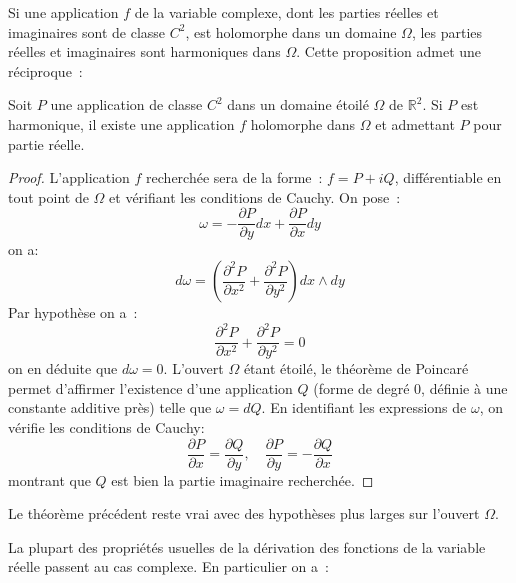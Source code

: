Si une application $f$ de la variable complexe, dont les parties
réelles et imaginaires sont de classe $C^2$, est holomorphe dans un
domaine $\Omega$, les parties réelles et imaginaires sont harmoniques
dans $\Omega$. Cette proposition admet une réciproque~:
\begin{theorem}
Soit $P$ une application de classe $C^2$ dans un domaine étoilé
$\Omega$ de
$\mathbb{R}^2$. 
Si $P$ est harmonique, il existe une application $f$ holomorphe dans $\Omega$ et
admettant $P$ pour partie réelle.
\end{theorem}
\begin{proof}
L'application $f$ recherchée sera de la forme~:
$f = P + i Q$, différentiable en tout point de $\Omega$ et vérifiant
les conditions de Cauchy. On pose~:
\[
\omega = - \frac{\partial P}{\partial y} dx + \frac{\partial P}{\partial
  x} dy
\]
on a:
\[
d \omega = \left(\frac{\partial^2 P}{\partial x^2} + \frac{\partial^2
P}{\partial y^2} \right)dx \wedge dy 
\]
Par hypothèse on a~:
\[
\frac{\partial^2 P}{\partial x^2} + \frac{\partial^2 P}{\partial y^2} = 0  
\]
on en déduite que $d\omega=0$. L'ouvert $\Omega$ étant étoilé, le théorème de Poincaré
permet d'affirmer l'existence d'une application $Q$ (forme de degré 0, définie
à une constante additive près) telle que $\omega = d Q$.
En identifiant les expressions de $\omega$, on vérifie les conditions de Cauchy:
\[
\frac{\partial P}{\partial x} = \frac{\partial Q}{\partial y} ,\quad
\frac{\partial P}{\partial y} = - \frac{\partial Q}{\partial x}
\]
montrant que $Q$ est bien la partie imaginaire recherchée.

\end{proof}
\begin{rem}
Le théorème précédent reste vrai avec des hypothèses plus larges sur l'ouvert $\Omega$. 
\end{rem}
La plupart des propriétés usuelles de la dérivation des fonctions de
la variable réelle passent au cas complexe. En particulier on a~:

